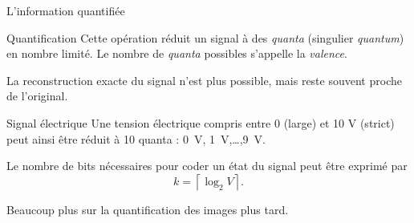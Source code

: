 \begin{frame}{L'information quantifiée}
  \begin{block}{Quantification}
    Cette opération réduit un signal à des \emph{quanta} (singulier
    \emph{quantum}) en nombre limité. Le nombre de \emph{quanta} possibles
    s'appelle la \emph{valence}.

    La reconstruction exacte du signal n'est plus possible, mais reste souvent
    proche de l'original.
  \end{block}
  \begin{example}{Signal électrique}
    Une tension électrique compris entre 0 (large) et 10 V (strict) peut ainsi
    être réduit à 10 quanta : 0~V, 1~V,\dots,9~V.
  \end{example}
  Le nombre de bits nécessaires pour coder un état du signal peut être exprimé
  par $$k=\left\lceil\log_2 V\right\rceil.$$

  \dialoginformation Beaucoup plus sur la quantification des images plus tard.

\end{frame}
